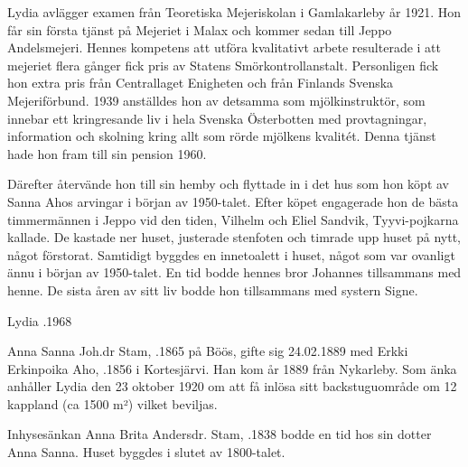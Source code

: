 Lydia avlägger examen från Teoretiska Mejeriskolan i Gamlakarleby år 1921. Hon får sin första tjänst på Mejeriet i Malax och kommer sedan till Jeppo Andelsmejeri. Hennes kompetens att utföra kvalitativt arbete resulterade i att mejeriet flera gånger fick pris av Statens Smörkontrollanstalt. Personligen fick hon extra pris från Centrallaget Enigheten och från Finlands Svenska Mejeriförbund. 1939 anställdes hon av detsamma som mjölkinstruktör, som innebar ett kringresande liv i hela Svenska Österbotten med provtagningar, information och skolning kring allt som rörde mjölkens kvalitét. Denna tjänst hade hon fram till sin pension 1960.

Därefter återvände hon till sin hemby och flyttade in i det hus som hon köpt av Sanna Ahos arvingar i början av 1950-talet. Efter köpet engagerade hon de bästa timmermännen i Jeppo vid den tiden, Vilhelm och Eliel Sandvik, Tyyvi-pojkarna kallade. De kastade ner huset, justerade stenfoten och timrade upp huset på nytt, något förstorat. Samtidigt byggdes en innetoalett i huset, något som var ovanligt ännu i början av 1950-talet. En tid bodde hennes bror Johannes tillsammans med henne. De sista åren av sitt liv bodde hon tillsammans med systern Signe.

Lydia .1968


Anna Sanna Joh.dr Stam, .1865 på Böös, gifte sig 24.02.1889 med Erkki Erkinpoika Aho, .1856 i Kortesjärvi. Han kom år 1889 från Nykarleby. Som änka anhåller Lydia den 23 oktober 1920 om att få inlösa sitt backstuguområde om 12 kappland (ca 1500 m²) vilket beviljas.
\begin{jhchildren}
  \item {}
  \item {}
  \item {}
  \item {}
\end{jhchildren}

Inhysesänkan Anna Brita Andersdr. Stam, .1838 bodde en tid hos sin dotter Anna Sanna. Huset byggdes i slutet av 1800-talet.





